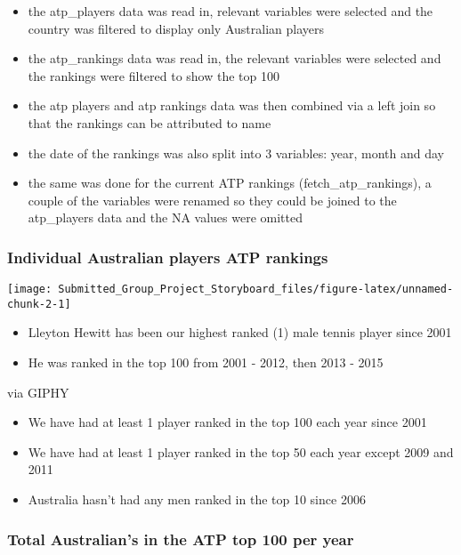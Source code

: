 \documentclass[]{article}
\providecommand{\tightlist}{%
  \setlength{\itemsep}{0pt}\setlength{\parskip}{0pt}}
\begin{document}
\begin{itemize}
\tightlist
\item
  the atp\_players data was read in, relevant variables were selected
  and the country was filtered to display only Australian players
\item
  the atp\_rankings data was read in, the relevant variables were
  selected and the rankings were filtered to show the top 100
\item
  the atp players and atp rankings data was then combined via a left
  join so that the rankings can be attributed to name
\item
  the date of the rankings was also split into 3 variables: year, month
  and day
\item
  the same was done for the current ATP rankings (fetch\_atp\_rankings),
  a couple of the variables were renamed so they could be joined to the
  atp\_players data and the NA values were omitted
\end{itemize}

\subsubsection{Individual Australian players ATP
rankings}\label{individual-australian-players-atp-rankings}

\begin{center}\texttt{[image: Submitted\_Group\_Project\_Storyboard\_files/figure-latex/unnamed-chunk-2-1]} \end{center}

\begin{itemize}
\tightlist
\item
  Lleyton Hewitt has been our highest ranked (1) male tennis player
  since 2001
\item
  He was ranked in the top 100 from 2001 - 2012, then 2013 - 2015
\end{itemize}

via GIPHY

\begin{itemize}
\tightlist
\item
  We have had at least 1 player ranked in the top 100 each year since
  2001
\item
  We have had at least 1 player ranked in the top 50 each year except
  2009 and 2011
\item
  Australia hasn't had any men ranked in the top 10 since 2006
\end{itemize}

\subsubsection{Total Australian's in the ATP top 100 per
year}\label{total-australians-in-the-atp-top-100-per-year}
\end{document}
